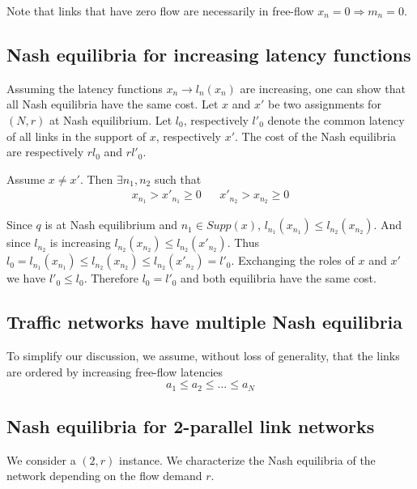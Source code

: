 Note that links that have zero flow are necessarily in free-flow $x_n = 0 \Rightarrow m_n = 0$.

\subsection{Nash equilibria for increasing latency functions}
Assuming the latency functions $x_n \rightarrow l_n(x_n)$ are increasing, one can show that all Nash equilibria have the same cost. Let $x$ and $x'$ be two assignments for $(N, r)$ at Nash equilibrium.  Let $l_0$, respectively $l'_0$ denote the common latency of all links in the support of $x$, respectively $x'$. The cost of the Nash equilibria are respectively $rl_0$ and $rl'_0$.

Assume $x \neq x'$. Then $\exists n_1, n_2$ such that
\begin{align*}
x_{n_1} > x'_{n_1} \geq 0 && x'_{n_2} > x_{n_2} \geq 0
\end{align*}

Since $q$ is at Nash equilibrium and $n_1 \in Supp(x)$, $l_{n_1}(x_{n_1}) \leq l_{n_2}(x_{n_2})$. And since $l_{n_2}$ is increasing $l_{n_2}(x_{n_2}) \leq l_{n_2}(x'_{n_2})$. Thus $l_0 = l_{n_1}(x_{n_1}) \leq l_{n_2}(x_{n_2}) \leq l_{n_2}(x'_{n_2}) = l'_0$. Exchanging the roles of $x$ and $x'$ we have $l'_0 \leq l_0$. Therefore $l_0 = l'_0$ and both equilibria have the same cost.

\subsection{Traffic networks have multiple Nash equilibria}
To simplify our discussion, we assume, without loss of generality, that the links are ordered by increasing free-flow latencies
\[
a_1 \leq a_2 \leq \dots \leq a_N
\]


\subsection{Nash equilibria for 2-parallel link networks}
We consider a $(2, r)$ instance. We characterize the Nash equilibria of the network depending on the flow demand $r$.

